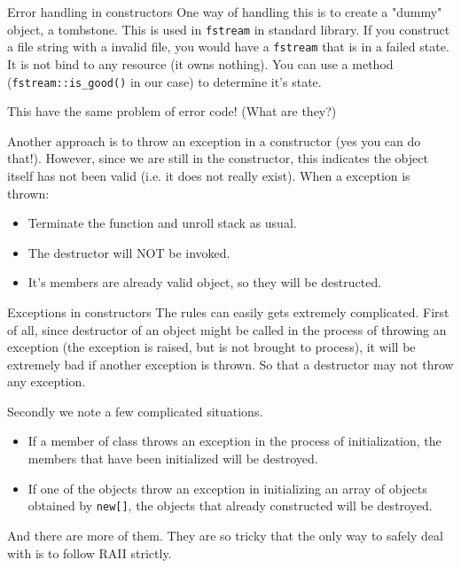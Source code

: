 \begin{frame}{Error handling in constructors}
One way of handling this is to create a "dummy" object, a tombstone. This is used in \texttt{fstream} in standard library. If you construct a file string with a invalid file, you would have a \texttt{fstream} that is in a failed state. It is not bind to any resource (it owns nothing). You can use a method (\texttt{fstream::is\_good()} in our case) to determine it's state. 

This have the same problem of error code! (What are they?)

\vspace{0.1in}
Another approach is to throw an exception in a constructor (yes you can do that!). However, since we are still in the constructor, this indicates the object itself has not been valid (i.e. it does not really exist). When a exception is thrown:
\begin{itemize}
	\item Terminate the function and unroll stack as usual.  
	\item The destructor will NOT be invoked.
	\item It's members are already valid object, so they will be destructed.
\end{itemize}
\end{frame}

\begin{frame}{Exceptions in constructors}
The rules can easily gets extremely complicated. First of all, since destructor of an object might be called in the process of throwing an exception (the exception is raised, but is not brought to process), it will be extremely bad if another exception is thrown. So that a destructor may not throw any exception.

\vspace{0.1in}
Secondly we note a few complicated situations.
\begin{itemize}
	\item If a member of class throws an exception in the process of initialization, the members that have been initialized will be destroyed.   
	\item If one of the objects throw an exception in initializing an array of objects obtained by \texttt{new[]}, the objects that already constructed will be destroyed.
\end{itemize}

And there are more of them. They are so tricky that the only way to safely deal with is to follow RAII strictly. 
\end{frame}

